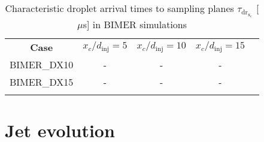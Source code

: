 \clearpage

\begin{table}[!h]
\centering
\caption{Characteristic droplet arrival times to sampling planes $\tau_\mathrm{dr_{x_c}}$ [$\mu$s] in BIMER simulations}
\begin{tabular}{ccccc}
\thickhline
\textbf{Case} & $x_c/d_\mathrm{inj} = 5$ & $x_c/d_\mathrm{inj} = 10$ & $x_c/d_\mathrm{inj} = 15$ \\
\thickhline 
BIMER\_DX10 & - & - & -  \\
BIMER\_DX15  & - & - & - \\
\thickhline
\end{tabular}
\label{tab:BIMER_SPS_characteristic_droplet_sampling_times}
\end{table}






\section{Jet evolution}

%





